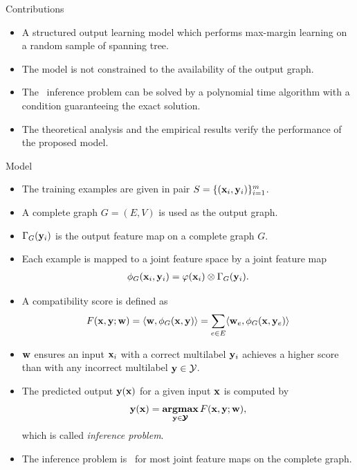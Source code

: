 \documentclass[first=dgreen,second=purple,logo=yellowexc]{aaltoslides}
\begin{document}
%
\begin{frame}{Contributions}
	\begin{itemize}
		\item A structured output learning model which performs max-margin learning on a random sample of spanning tree.
		\item The model is not constrained to the availability of the output graph.
		\item The \nphard\ inference problem can be solved by a polynomial time algorithm with a condition guaranteeing the exact solution.
		\item The theoretical analysis and the empirical results verify the performance of the proposed model.
	\end{itemize}
\end{frame}



%
\begin{frame}[allowframebreaks]{Model}
	\begin{itemize}
		\item The training examples are given in pair $S=\{(\mathbf {x}_i,\mathbf {y}_i)\}_{i=1}^{m}$.
		\item A complete graph $G=(E,V)$ is used as the output graph.
		\item $\Gamma_G(\mathbf {y}_i)$ is the output feature map on a complete graph $G$.
		\item Each example is mapped to a joint feature space by a joint feature map
		\begin{align*}
			\phi_G(\mathbf {x}_i,\mathbf {y}_i) = \varphi(\mathbf {x}_i)\otimes\Gamma_G(\mathbf {y}_i).
		\end{align*}
		\item A compatibility score is defined as
		\begin{align*}
			F(\mathbf {x},\mathbf {y};\mathbf {w}) = \langle \mathbf {w}, \phi_G(\mathbf {x},\mathbf {y}) \rangle=\sum_{e\in E}\langle \mathbf {w}_e, \phi_G(\mathbf {x},\mathbf {y}_{e}) \rangle
		\end{align*} 
		\item $\mathbf {w}$ ensures an input $\mathbf {x}_i$ with a correct multilabel $\mathbf {y}_i$ achieves a higher score than with any incorrect multilabel $\mathbf {y}\in\mathcal{Y}$.
		\item The predicted output $\mathbf {y}(\mathbf {x})$ for a given input $\mathbf {x}$ is computed by
		\begin{align*}
			\mathbf {y}(\mathbf {x}) = \underset{\mathbf {y}\in\pmb {\mathcal{Y}}}{\textbf{argmax}}\,F(\mathbf {x},\mathbf {y};\mathbf {w}),
		\end{align*}
		which is called \textit{inference problem}.
		\item The {inference problem} is \nphard\ for most joint feature maps on the complete graph.
	\end{itemize}
\end{frame}
\end{document}
